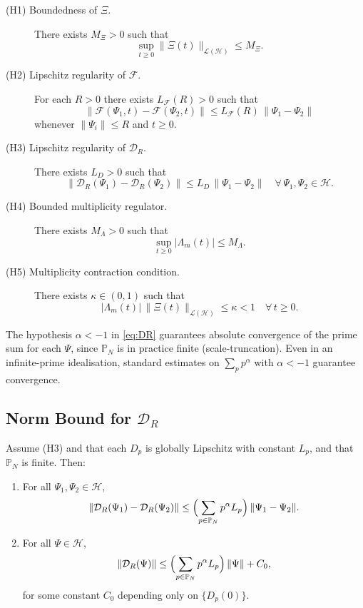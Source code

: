 \documentclass[11pt]{article}
\begin{document}
\begin{description}
  \item[(H1) Boundedness of $\Xi$.]
        There exists $M_\Xi>0$ such that
        \[
          \sup_{t\ge 0}\|\Xi(t)\|_{\mathcal{L}(\mathcal{H})} \le M_\Xi.
        \]
  \item[(H2) Lipschitz regularity of $\mathcal{F}$.]
        For each $R>0$ there exists $L_{\mathcal{F}}(R)>0$ such that
        \[
          \|\mathcal{F}(\Psi_1,t) - \mathcal{F}(\Psi_2,t)\|
          \le
          L_{\mathcal{F}}(R)\,\|\Psi_1-\Psi_2\|
        \]
        whenever $\|\Psi_i\|\le R$ and $t\ge 0$.
  \item[(H3) Lipschitz regularity of $\mathcal{D}_R$.]
        There exists $L_D>0$ such that
        \[
          \|\mathcal{D}_R(\Psi_1) - \mathcal{D}_R(\Psi_2)\|
          \le
          L_D\,\|\Psi_1-\Psi_2\|
          \quad \forall\,\Psi_1,\Psi_2\in\mathcal{H}.
        \]
  \item[(H4) Bounded multiplicity regulator.]
        There exists $M_{\Lambda}>0$ such that
        \[
          \sup_{t\ge 0}|\Lambda_m(t)| \le M_{\Lambda}.
        \]
  \item[(H5) Multiplicity contraction condition.]
        There exists $\kappa\in(0,1)$ such that
        \begin{equation}
          |\Lambda_m(t)|\,\|\Xi(t)\|_{\mathcal{L}(\mathcal{H})} \le \kappa < 1
          \quad \forall\,t\ge 0.
          \label{eq:H5}
        \end{equation}
\end{description}

The hypothesis $\alpha<-1$ in \eqref{eq:DR} guarantees absolute convergence of the prime sum for each $\Psi$, since $\mathbb{P}_N$ is in practice finite (scale-truncation). Even in an infinite-prime idealisation, standard estimates on $\sum_{p}p^\alpha$ with $\alpha<-1$ guarantee convergence.

\subsection{Norm Bound for $\mathcal{D}_R$}

\begin{lemma}
Assume (H3) and that each $D_p$ is globally Lipschitz with constant $L_p$, and that $\mathbb{P}_N$ is finite. Then:
\begin{enumerate}
  \item For all $\Psi_1,\Psi_2\in\mathcal{H}$,
        \[
          \|\mathcal{D}_R(\Psi_1) - \mathcal{D}_R(\Psi_2)\|
          \le
          \Bigl(\sum_{p\in\mathbb{P}_N}p^\alpha L_p\Bigr)\,\|\Psi_1-\Psi_2\|.
        \]
  \item For all $\Psi\in\mathcal{H}$,
        \[
          \|\mathcal{D}_R(\Psi)\|
          \le
          \Bigl(\sum_{p\in\mathbb{P}_N}p^\alpha L_p\Bigr)\,\|\Psi\| + C_0,
        \]
        for some constant $C_0$ depending only on $\{D_p(0)\}$.
\end{enumerate}
\end{lemma}
\end{document}
